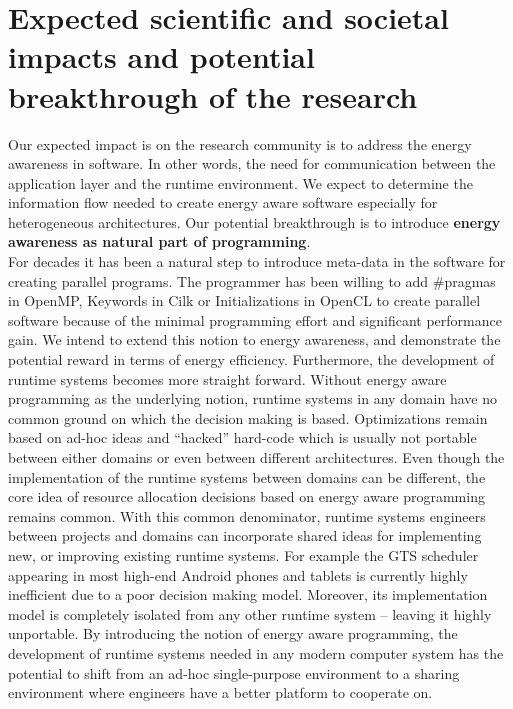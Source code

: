 \documentclass{article}
\begin{document}
\section{Expected scientific and societal impacts and potential breakthrough of the research}
Our expected impact is on the research community is to address the energy awareness in software. 
In other words, the need for communication between the application layer and the runtime environment. 
We expect to determine the information flow needed to create energy aware software especially for heterogeneous architectures. 
Our potential breakthrough is to introduce \textbf{energy awareness as natural part of programming}.\\ 
For decades it has been a natural step to introduce meta-data in the software for creating parallel programs. 
The programmer has been willing to add \#pragmas in OpenMP, Keywords in Cilk or Initializations in OpenCL to create parallel software because of the minimal programming effort and significant performance gain. 
We intend to extend this notion to energy awareness, and demonstrate the potential reward in terms of energy efficiency. 
Furthermore, the development of runtime systems becomes more straight forward. 
Without energy aware programming as the underlying notion, runtime systems in any domain have no common ground on which the decision making is based. 
Optimizations remain based on ad-hoc ideas and ``hacked'' hard-code which is usually not portable between either domains or even between different architectures. 
Even though the implementation of the runtime systems between domains can be different, the core idea of resource allocation decisions based on energy aware programming remains common. 
With this common denominator, runtime systems engineers between projects and domains can incorporate shared ideas for implementing new, or improving existing runtime systems. 
For example the GTS scheduler appearing in most high-end Android phones and tablets is currently highly inefficient due to a poor decision making model. 
Moreover, its implementation model is completely isolated from any other runtime system – leaving it highly unportable. 
By introducing the notion of energy aware programming, the development of runtime systems needed in any modern computer system has the potential to shift from an ad-hoc single-purpose environment to a sharing environment where engineers have a better platform to cooperate on.
\end{document}
